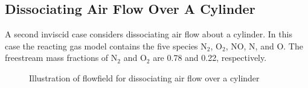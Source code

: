 \subsection{Dissociating Air Flow Over A Cylinder\label{sec:comp_ns_cyl_air}}
A second inviscid case considers dissociating air flow about a cylinder.  In this case the reacting gas model contains the five species N$_2$, O$_2$, NO, N, and O. The freestream mass fractions of N$_2$ and O$_2$ are 0.78 and 0.22, respectively.
\begin{figure}[hbtp]
  \begin{center}
    \caption{Illustration of flowfield for dissociating air flow over a cylinder\label{fig:5sp_air_cyl_flowfield}}
  \end{center}
\end{figure}
